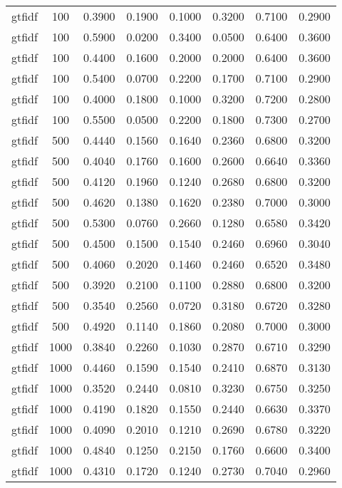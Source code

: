 \begin{scriptsize}
\begin{longtable}{cccccccc}
	gtfidf   & 100  & 0.3900 & 0.1900 & 0.1000 & 0.3200 & 0.7100 & 0.2900 \\
	gtfidf   & 100  & 0.5900 & 0.0200 & 0.3400 & 0.0500 & 0.6400 & 0.3600 \\
	gtfidf   & 100  & 0.4400 & 0.1600 & 0.2000 & 0.2000 & 0.6400 & 0.3600 \\
	gtfidf   & 100  & 0.5400 & 0.0700 & 0.2200 & 0.1700 & 0.7100 & 0.2900 \\
	gtfidf   & 100  & 0.4000 & 0.1800 & 0.1000 & 0.3200 & 0.7200 & 0.2800 \\
	gtfidf   & 100  & 0.5500 & 0.0500 & 0.2200 & 0.1800 & 0.7300 & 0.2700 \\
	gtfidf   & 500  & 0.4440 & 0.1560 & 0.1640 & 0.2360 & 0.6800 & 0.3200 \\
	gtfidf   & 500  & 0.4040 & 0.1760 & 0.1600 & 0.2600 & 0.6640 & 0.3360 \\
	gtfidf   & 500  & 0.4120 & 0.1960 & 0.1240 & 0.2680 & 0.6800 & 0.3200 \\
	gtfidf   & 500  & 0.4620 & 0.1380 & 0.1620 & 0.2380 & 0.7000 & 0.3000 \\
	gtfidf   & 500  & 0.5300 & 0.0760 & 0.2660 & 0.1280 & 0.6580 & 0.3420 \\
	gtfidf   & 500  & 0.4500 & 0.1500 & 0.1540 & 0.2460 & 0.6960 & 0.3040 \\
	gtfidf   & 500  & 0.4060 & 0.2020 & 0.1460 & 0.2460 & 0.6520 & 0.3480 \\
	gtfidf   & 500  & 0.3920 & 0.2100 & 0.1100 & 0.2880 & 0.6800 & 0.3200 \\
	gtfidf   & 500  & 0.3540 & 0.2560 & 0.0720 & 0.3180 & 0.6720 & 0.3280 \\
	gtfidf   & 500  & 0.4920 & 0.1140 & 0.1860 & 0.2080 & 0.7000 & 0.3000 \\
	gtfidf   & 1000 & 0.3840 & 0.2260 & 0.1030 & 0.2870 & 0.6710 & 0.3290 \\
	gtfidf   & 1000 & 0.4460 & 0.1590 & 0.1540 & 0.2410 & 0.6870 & 0.3130 \\
	gtfidf   & 1000 & 0.3520 & 0.2440 & 0.0810 & 0.3230 & 0.6750 & 0.3250 \\
	gtfidf   & 1000 & 0.4190 & 0.1820 & 0.1550 & 0.2440 & 0.6630 & 0.3370 \\
	gtfidf   & 1000 & 0.4090 & 0.2010 & 0.1210 & 0.2690 & 0.6780 & 0.3220 \\
	gtfidf   & 1000 & 0.4840 & 0.1250 & 0.2150 & 0.1760 & 0.6600 & 0.3400 \\
	gtfidf   & 1000 & 0.4310 & 0.1720 & 0.1240 & 0.2730 & 0.7040 & 0.2960 \\

\end{longtable}
\end{scriptsize}
